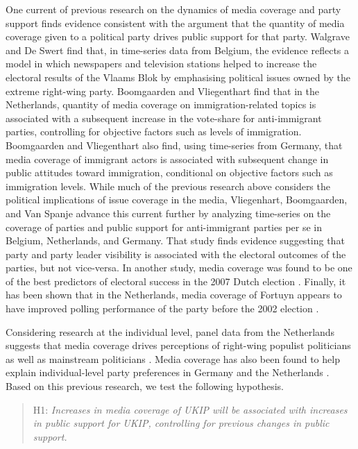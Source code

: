 \documentclass[12pt,]{article}
\begin{document}
One current of previous research on the dynamics of media coverage and
party support finds evidence consistent with the argument that the
quantity of media coverage given to a political party drives public
support for that party. Walgrave and De Swert
\citeyearpar{walgrave_making_2004} find that, in time-series data from
Belgium, the evidence reflects a model in which newspapers and
television stations helped to increase the electoral results of the
Vlaams Blok by emphasising political issues owned by the extreme
right-wing party. Boomgaarden and Vliegenthart
\citetext{\citeyear{Boomgaarden:2007ia}; \citealp{vliegenthart_why_2010}}
find that in the Netherlands, quantity of media coverage on
immigration-related topics is associated with a subsequent increase in
the vote-share for anti-immigrant parties, controlling for objective
factors such as levels of immigration. Boomgaarden and Vliegenthart
\citeyearpar{Boomgaarden:2009ke} also find, using time-series from
Germany, that media coverage of immigrant actors is associated with
subsequent change in public attitudes toward immigration, conditional on
objective factors such as immigration levels. While much of the previous
research above considers the political implications of issue coverage in
the media, Vliegenhart, Boomgaarden, and Van Spanje
\citeyearpar{vliegenthart_anti-immigrant_2012} advance this current
further by analyzing time-series on the coverage of parties and public
support for anti-immigrant parties per se in Belgium, Netherlands, and
Germany. That study finds evidence suggesting that party and party
leader visibility is associated with the electoral outcomes of the
parties, but not vice-versa. In another study, media coverage was found
to be one of the best predictors of electoral success in the 2007 Dutch
election \citep{hopmann_effects_2010}. Finally, it has been shown that
in the Netherlands, media coverage of Fortuyn appears to have improved
polling performance of the party before the 2002 election
\citep{koopmans_rise_2009}.

Considering research at the individual level, panel data from the
Netherlands suggests that media coverage drives perceptions of
right-wing populist politicians as well as mainstream politicians
\citep{Bos:2011iy}. Media coverage has also been found to help explain
individual-level party preferences in Germany
\citep{semetko_germanys_1994} and the Netherlands
\citep{oegema_personalization_2009}. Based on this previous research, we
test the following hypothesis.

\begin{quote}
H1: \emph{Increases in media coverage of UKIP will be associated with
increases in public support for UKIP, controlling for previous changes
in public support.}
\end{quote}
\end{document}
